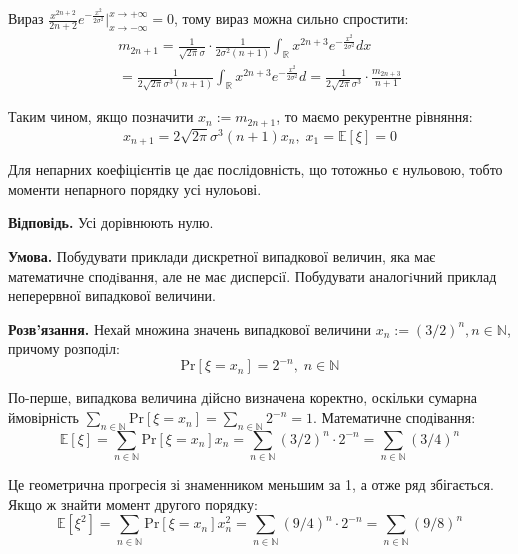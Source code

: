 \documentclass[oneside,solution]{karazin-prob-theory-assign}
\begin{document}
Вираз $\frac{x^{2n+2}}{2n+2}e^{-\frac{x^2}{2\sigma^2}}\Big|_{x \to -\infty}^{x \to +\infty}=0$, тому вираз можна сильно спростити:
\begin{gather}
    m_{2n+1} = \frac{1}{\sqrt{2\pi}\sigma} \cdot \frac{1}{2\sigma^2(n+1)}\int_{\mathbb{R}}x^{2n+3}e^{-\frac{x^2}{2\sigma^2}}dx \nonumber \\
    = \frac{1}{2\sqrt{2\pi}\sigma^3(n+1)}\int_{\mathbb{R}} x^{2n+3}e^{-\frac{x^2}{2\sigma^2}}d = \frac{1}{2\sqrt{2\pi}\sigma^3} \cdot \frac{m_{2n+3}}{n+1}
\end{gather}

Таким чином, якщо позначити $x_n := m_{2n+1}$, то маємо рекурентне рівняння:
\begin{equation}
    x_{n+1} = 2\sqrt{2\pi}\sigma^3 (n+1)x_n, \; x_1 = \mathbb{E}[\xi] = 0
\end{equation}

Для непарних коефіцієнтів це дає послідовність, що тотожньо є нульовою, тобто моменти непарного порядку усі нулоьові.

\textbf{Відповідь.} Усі дорівнюють нулю.


\hspace{20px}\textbf{Умова.} Побудувати приклади дискретної випадкової величин, яка має математичне сподiвання,
але не має дисперсiї. Побудувати аналогiчний приклад неперервної випадкової величини.

\textbf{Розв'язання.} Нехай множина значень випадкової величини $x_n := (3/2)^n, n \in \mathbb{N}$, причому розподіл:
\begin{equation}
    \text{Pr}[\xi = x_n] = 2^{-n}, \; n \in \mathbb{N}
\end{equation}

По-перше, випадкова величина дійсно визначена коректно, оскільки сумарна ймовірність $\sum_{n \in \mathbb{N}}\text{Pr}[\xi=x_n] = \sum_{n \in \mathbb{N}}2^{-n} = 1$. Математичне сподівання:
\begin{equation}
    \mathbb{E}[\xi] = \sum_{n \in \mathbb{N}}\text{Pr}[\xi=x_n]x_n = \sum_{n \in \mathbb{N}}(3/2)^n \cdot 2^{-n} = \sum_{n \in \mathbb{N}} (3/4)^n
\end{equation}

Це геометрична прогресія зі знаменником меньшим за 1, а отже ряд збігається. Якщо ж знайти момент другого порядку:
\begin{equation}
    \mathbb{E}[\xi^2] = \sum_{n \in \mathbb{N}}\text{Pr}[\xi=x_n]x_n^2 = \sum_{n \in \mathbb{N}} (9/4)^n \cdot 2^{-n} = \sum_{n \in \mathbb{N}}(9/8)^n
\end{equation}
\end{document}
